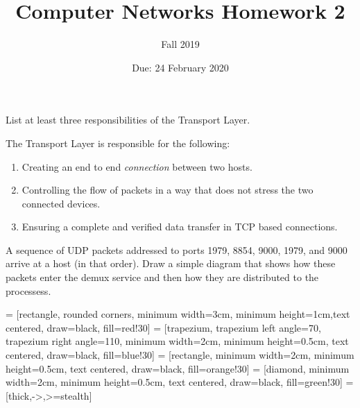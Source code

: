 \documentclass[12pt,addpoints,answers]{exam}
\title{Computer Networks Homework 2}
\author{Fall 2019}
\date{Due: 24 February 2020}
\begin{document}
\maketitle

\begin{questions}
\question[6] List at least three responsibilities of the Transport Layer.
\begin{solution}
	The Transport Layer is responsible for the following:
	\begin{enumerate}
		\item Creating an end to end \textit{connection} between two hosts.
		\item Controlling the flow of packets in a way that does not stress the two connected devices.
		\item Ensuring a complete and verified data transfer in TCP based connections.
	\end{enumerate}
\end{solution}

\question[5] A sequence of UDP packets addressed to ports 1979, 8854, 9000, 1979, and 9000 arrive at a host (in that order). Draw a simple diagram that shows how these packets enter the demux service and then how they are distributed to the processess.
\begin{solution}
	 = [rectangle, rounded corners, minimum width=3cm, minimum height=1cm,text centered, draw=black, fill=red!30]
	 = [trapezium, trapezium left angle=70, trapezium right angle=110, minimum width=2cm, minimum height=0.5cm, text centered, draw=black, fill=blue!30]
	 = [rectangle, minimum width=2cm, minimum height=0.5cm, text centered, draw=black, fill=orange!30]
	 = [diamond, minimum width=2cm, minimum height=0.5cm, text centered, draw=black, fill=green!30]
	 = [thick,->,>=stealth]
	
\end{solution}
\end{questions}
\end{document}
